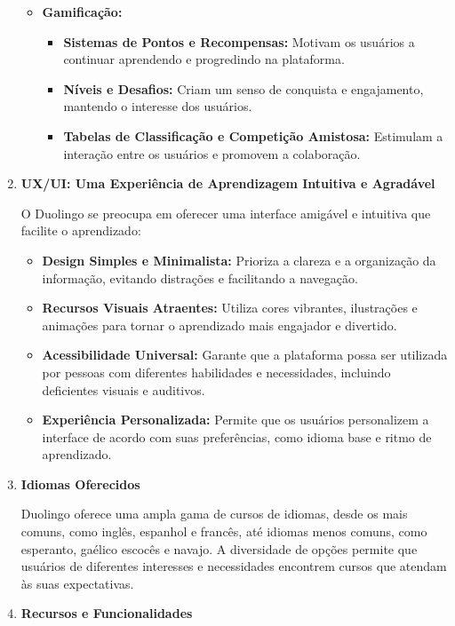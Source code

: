 \begin{enumerate}
\begin{itemize}
        \item \textbf{Gamificação:}
        \begin{itemize}
            \item \textbf{Sistemas de Pontos e Recompensas:} Motivam os usuários a continuar aprendendo e progredindo na plataforma.
            \item \textbf{Níveis e Desafios:} Criam um senso de conquista e engajamento, mantendo o interesse dos usuários.
            \item \textbf{Tabelas de Classificação e Competição Amistosa:} Estimulam a interação entre os usuários e promovem a colaboração.
        \end{itemize}
    \end{itemize}

    \item \textbf{UX/UI: Uma Experiência de Aprendizagem Intuitiva e Agradável}
    
    O Duolingo se preocupa em oferecer uma interface amigável e intuitiva que facilite o aprendizado:

    \begin{itemize}
        \item \textbf{Design Simples e Minimalista:} Prioriza a clareza e a organização da informação, evitando distrações e facilitando a navegação.
        \item \textbf{Recursos Visuais Atraentes:} Utiliza cores vibrantes, ilustrações e animações para tornar o aprendizado mais engajador e divertido.
        \item \textbf{Acessibilidade Universal:} Garante que a plataforma possa ser utilizada por pessoas com diferentes habilidades e necessidades, incluindo deficientes visuais e auditivos.
        \item \textbf{Experiência Personalizada:} Permite que os usuários personalizem a interface de acordo com suas preferências, como idioma base e ritmo de aprendizado.
    \end{itemize}

    \item \textbf{Idiomas Oferecidos}
    
    Duolingo oferece uma ampla gama de cursos de idiomas, desde os mais comuns, como inglês, espanhol e francês, até idiomas menos comuns, como esperanto, gaélico escocês e navajo. A diversidade de opções permite que usuários de diferentes interesses e necessidades encontrem cursos que atendam às suas expectativas.

    \item \textbf{Recursos e Funcionalidades}
    

\end{enumerate}
